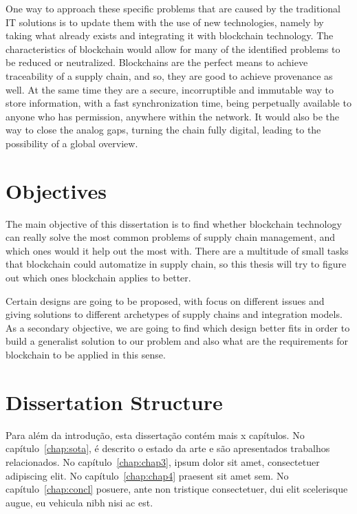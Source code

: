     One way to approach these specific problems that are caused by the traditional IT solutions is to update them with the use of new technologies, namely by taking what already exists and integrating it with blockchain technology. The characteristics of blockchain would allow for many of the identified problems to be reduced or neutralized. Blockchains are the perfect means to achieve traceability of a supply chain, and so, they are good to achieve provenance as well. At the same time they are a secure, incorruptible and immutable way to store information, with a fast synchronization time, being perpetually available to anyone who has permission, anywhere within the network. It would also be the way to close the analog gaps, turning the chain fully digital, leading to the possibility of a global overview.

\section{Objectives}
\label{sec:objectives}
The main objective of this dissertation is to find whether blockchain technology can really solve the most common problems of supply chain management, and which ones would it help out the most with. There are a multitude of small tasks that blockchain could automatize in supply chain, so this thesis will try to figure out which ones blockchain applies to better. 


Certain designs are going to be proposed, with focus on different issues and giving solutions to different archetypes of supply chains and integration models. As a secondary objective, we are going to find which design better fits in order to build a generalist solution to our problem and also what are the requirements for blockchain to be applied in this sense.

\section{Dissertation Structure} \label{sec:struct}

Para além da introdução, esta dissertação contém mais x capítulos.
No capítulo~\ref{chap:sota}, é descrito o estado da arte e são
apresentados trabalhos relacionados. 
No capítulo~\ref{chap:chap3}, ipsum dolor sit amet, consectetuer
adipiscing elit.
No capítulo~\ref{chap:chap4} praesent sit amet sem. 
No capítulo~\ref{chap:concl}  posuere, ante non tristique
consectetuer, dui elit scelerisque augue, eu vehicula nibh nisi ac
est. 

